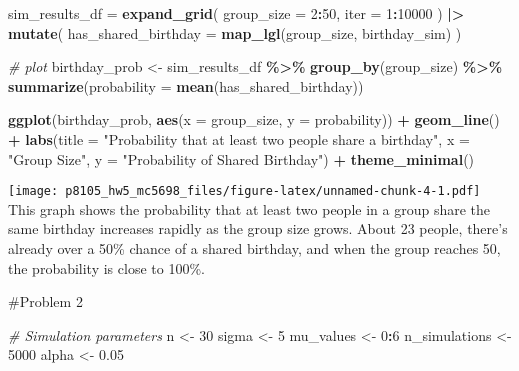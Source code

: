 \documentclass[
]{article}
\newenvironment{Shaded}{\begin{snugshade}}{\end{snugshade}}
\newcommand{\AttributeTok}[1]{\textcolor[rgb]{0.13,0.29,0.53}{#1}}
\newcommand{\CommentTok}[1]{\textcolor[rgb]{0.56,0.35,0.01}{\textit{#1}}}
\newcommand{\DecValTok}[1]{\textcolor[rgb]{0.00,0.00,0.81}{#1}}
\newcommand{\FloatTok}[1]{\textcolor[rgb]{0.00,0.00,0.81}{#1}}
\newcommand{\FunctionTok}[1]{\textcolor[rgb]{0.13,0.29,0.53}{\textbf{#1}}}
\newcommand{\NormalTok}[1]{#1}
\newcommand{\OtherTok}[1]{\textcolor[rgb]{0.56,0.35,0.01}{#1}}
\newcommand{\SpecialCharTok}[1]{\textcolor[rgb]{0.81,0.36,0.00}{\textbf{#1}}}
\newcommand{\StringTok}[1]{\textcolor[rgb]{0.31,0.60,0.02}{#1}}
\begin{document}
\begin{Shaded}
\begin{Highlighting}[]
\NormalTok{sim\_results\_df }\OtherTok{=}
  \FunctionTok{expand\_grid}\NormalTok{(}
  \AttributeTok{group\_size =} \DecValTok{2}\SpecialCharTok{:}\DecValTok{50}\NormalTok{,}
  \AttributeTok{iter =} \DecValTok{1}\SpecialCharTok{:}\DecValTok{10000}
\NormalTok{) }\SpecialCharTok{|\textgreater{}}
  \FunctionTok{mutate}\NormalTok{(}
    \AttributeTok{has\_shared\_birthday =} \FunctionTok{map\_lgl}\NormalTok{(group\_size, birthday\_sim)}
\NormalTok{  )}
\end{Highlighting}
\end{Shaded}

\begin{Shaded}
\begin{Highlighting}[]
\CommentTok{\# plot}
\NormalTok{birthday\_prob }\OtherTok{\textless{}{-}}\NormalTok{ sim\_results\_df }\SpecialCharTok{\%\textgreater{}\%}
  \FunctionTok{group\_by}\NormalTok{(group\_size) }\SpecialCharTok{\%\textgreater{}\%}
  \FunctionTok{summarize}\NormalTok{(}\AttributeTok{probability =} \FunctionTok{mean}\NormalTok{(has\_shared\_birthday))}

\FunctionTok{ggplot}\NormalTok{(birthday\_prob, }\FunctionTok{aes}\NormalTok{(}\AttributeTok{x =}\NormalTok{ group\_size, }\AttributeTok{y =}\NormalTok{ probability)) }\SpecialCharTok{+}
  \FunctionTok{geom\_line}\NormalTok{() }\SpecialCharTok{+}
  \FunctionTok{labs}\NormalTok{(}\AttributeTok{title =} \StringTok{"Probability that at least two people share a birthday"}\NormalTok{,}
       \AttributeTok{x =} \StringTok{"Group Size"}\NormalTok{,}
       \AttributeTok{y =} \StringTok{"Probability of Shared Birthday"}\NormalTok{) }\SpecialCharTok{+}
  \FunctionTok{theme\_minimal}\NormalTok{()}
\end{Highlighting}
\end{Shaded}

\texttt{[image: p8105\_hw5\_mc5698\_files/figure-latex/unnamed-chunk-4-1.pdf]}
This graph shows the probability that at least two people in a group
share the same birthday increases rapidly as the group size grows. About
23 people, there's already over a 50\% chance of a shared birthday, and
when the group reaches 50, the probability is close to 100\%.

\#Problem 2

\begin{Shaded}
\begin{Highlighting}[]
\CommentTok{\# Simulation parameters}
\NormalTok{n }\OtherTok{\textless{}{-}} \DecValTok{30}
\NormalTok{sigma }\OtherTok{\textless{}{-}} \DecValTok{5}
\NormalTok{mu\_values }\OtherTok{\textless{}{-}} \DecValTok{0}\SpecialCharTok{:}\DecValTok{6}
\NormalTok{n\_simulations }\OtherTok{\textless{}{-}} \DecValTok{5000}
\NormalTok{alpha }\OtherTok{\textless{}{-}} \FloatTok{0.05}
\end{Highlighting}
\end{Shaded}
\end{document}
